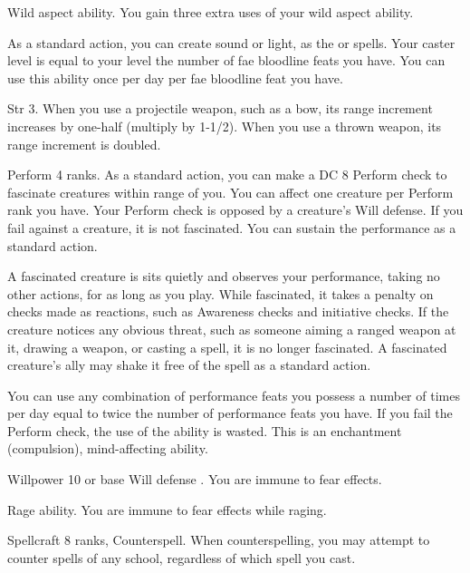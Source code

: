 \featpre Wild aspect ability.
\featben You gain three extra uses of your wild aspect ability.

\featben As a standard action, you can create sound or light, as the 
or 
spells.
Your caster level is equal to your level \add the number of fae bloodline feats you have.
You can use this ability once per day per fae bloodline feat you have.

\featpre Str 3.
\featben When you use a projectile weapon, such as a bow, its range increment increases by one-half (multiply by 1-1/2).
When you use a thrown weapon, its range increment is doubled.

\featpre Perform 4 ranks.
\featben As a standard action, you can make a DC 8 Perform check to fascinate creatures within \rngmed range of you.
You can affect one creature per Perform rank you have.
Your Perform check is opposed by a creature's Will defense.
If you fail against a creature, it is not fascinated.
You can sustain the performance as a standard action.

A fascinated creature is sits quietly and observes your performance, taking no other actions, for as long as you play.
While fascinated, it takes a  penalty on checks made as reactions, such as Awareness checks and initiative checks.
If the creature notices any obvious threat, such as someone aiming a ranged weapon at it, drawing a weapon, or casting a spell, it is no longer fascinated.
A fascinated creature's ally may shake it free of the spell as a standard action.

You can use any combination of performance feats you possess a number of times per day equal to twice the number of performance feats you have.
If you fail the Perform check, the use of the ability is wasted.
This is an enchantment (compulsion), mind-affecting ability.

\featpre Willpower 10 or base Will defense .
\featben You are immune to fear effects.

\featpre Rage ability.
\featben You are immune to fear effects while raging.

\featpres Spellcraft 8 ranks, Counterspell.
\featben When counterspelling, you may attempt to counter spells of any school, regardless of which spell you cast.


